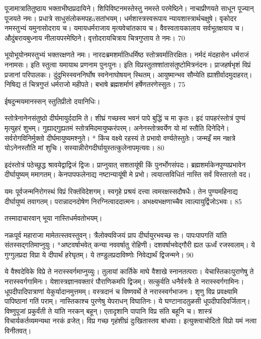 पूजामात्रातितुष्ठाय भक्ताभीष्ठप्रदायिने।
शिपिविष्टनमस्तेस्तु नमस्ते परमेष्ठिने।
नाचाप्रीणयते साधून पूज्यान् पूजयते नमः।
प्रधात्रे साधुसंलोकमपहāसतांभयम्।
धर्मशास्त्रस्वरूपाय न्यायशास्त्रार्थचक्षुषे।
वृकोदर नमस्तुभ्यं यमुनासोदराय च।
यमायधर्मराजाय मृत्यवेचांतकाय च।
वैवस्वतायकालाय सर्वभूतक्षयाय च।
औदुंबरायबुध्नाय नीलायपरमेष्ठिने।
वृत्तोदरायचित्राय चित्रगुप्ताय ते नमः।
70

भूयोभूयोनमस्तुभ्यं भक्तरक्षणते नमः।
नारदःब्रमशर्मातिधर्मिष्ठ स्तोत्रवर्मातिरक्षितः।
नर्मदं मंदहासेन धर्मराजं ननामसः।
इति स्तुत्वा यमायाथ प्रणनाम पुनःपुनः।
इति विप्रस्तुतश्शांतासंतुष्टोमित्रनंदनः।
प्राजहर्षभृशं विप्रं प्रजानां परिपालकः।
दुंदुभिस्स्वननिर्घोष स्वनेनाघोषयन् स्थितम्।
आयुष्मान्भव सौम्येति ह्याशीर्वादमुदाहरत्।
निषिद्य तं चित्रगुप्तं धर्मराजो महीपते।
बभाषे ब्रह्मशर्माणं हर्षेणतरणेस्सुतः।
75

ईषदुन्मयमानस्सन् स्तुतिप्रीतो दयानिधिः।

स्तोत्रेनानेनसंतुष्ठो दीर्घमायुर्ददामि ते।
शीघ्रं गच्छस्व भवनं पापे बुद्धिं च मा कृतः।
इदं पापहरंस्तोत्रं पुण्यं मृत्युहरं शुभम्।
गुह्याद्गुह्यतमं स्तोत्रमिदमायुष्करंपरम्।
अनेनस्तोत्रवर्येण यो मां स्तौति दिनेदिने।
सर्वरोगविनिर्मुक्तो दीर्घमायुष्यमश्नुते।
* किंच वक्ष्ये रहस्यं ते प्रभावो वर्ण्यतेस्तुतेः।
जन्मइँ मम नक्षत्रे योऽनेनस्तौति मां शुचिः।
सस्यान्नीरोगदीर्घायुस्तत्कुलेनापमृत्यवः।
80

इदंस्तोत्रं पठेच्छुद्ध श्रावयेद्वाद्विजं द्विजः।
प्राप्नुयात् सशतायूंषी किं पुनर्भोगसंपदः।
ब्रह्मशर्माकेनपुण्यप्रभावेन दीर्घायुष्यम् ममागतम्।
केनपापफलेनाद्य नष्टान्यायूंषी मे प्रभो।
त्वयात्सविधितं नास्ति सर्वं विस्तारतो वद।

यमः
पूर्वजन्मनिरोगस्थं विप्रं रिक्तंविदेशगम्।
स्वगृहे प्रश्रयं दत्त्वा त्वमरक्षस्सदौषधैः।
तेन पुण्यमहिनाद्य दीर्घायुष्यं तवागतम्।
परान्नादनदोषेण निरग्नित्वाददात्मनः।
अभक्ष्यभक्षणाच्चैव त्वाल्पायुर्द्विजोऽभवः।
85

तस्मादाचारवान् भूया नास्तिधर्मवतोभयम्।

नळःपूर्व महाराजा मामेतत्स्तवस्तुवन्।
त्रैलोक्यविजयं प्राप दीर्घायुरभवच्छ सः।
पापःपापगतिं यांति संतस्सद्गतिमाप्नुयुः।
*अष्टवर्षाभवेत् कन्या नववर्षातु रोहिणी।
दशवर्षाभवेद्गौरी ह्यत ऊर्ध्वं रजस्वलाम्।
ये गुग्गुलप्रदा विप्रा ये दीपार्थं हरेघृतम्।
ये तण्डुलप्रदाविष्णोः निवेद्यार्थं द्विजन्मने।
90

ये वैश्वदेविके विप्रे ते नरास्स्वर्गमाप्नुय्युः।
तुलायां कार्तिके माघे वैशाखे स्नानतत्पराः।
येचास्तिकाःपुराणेषु ते नरास्स्वर्गगामिनः।
येशास्त्रज्ञानवक्तारं पौराणिकमपि द्विजम्।
सत्कुर्वति धनैर्वस्त्रैः ते नरास्स्वर्गगामिनः।
धूपदीपादिपात्राणां येकुर्यादानमुत्तमम्।
वस्त्रदानं च विष्णवर्थे ते नरास्स्वर्गभाजनः।
शृणु विप्र प्रवक्ष्यामि पापिष्ठानां गतिं पराम्।
नास्तिकाश्च पुरणेषु येपराधन् विघातिनः।
ये घण्टानादतुळसी धूपदीपादिवर्जितान्।
विष्णुपूजां प्रकुर्वंती ते यांति नरकन् बहून्।
एतादृशानि पापानि विप्र संति बहूनि च।
शास्त्रं विचार्यकर्तव्यमन्यथा नरकं व्रजेत्।
विप्र गच्छ गृहंशीघ्रं दुःखितास्तव बांधवाः।
इत्युक्त्वाचोदितो विप्रो यमं नत्वा विनीतवत्।

